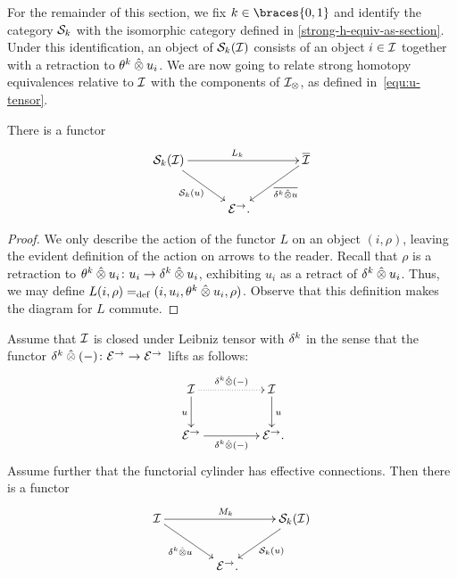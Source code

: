 \documentclass[reqno,10pt,a4paper,oneside,draft]{amsart}
\begin{document}
For the remainder of this section, we fix $k \in \braces{0, 1}$ and identify the category $\cal{S}_k$ with the isomorphic category defined in \cref{strong-h-equiv-as-section}.
Under this identification, an object of $\cal{S}_k(\cal{I})$ consists of an object $i \in \cal{I}$ together with a retraction to $\thetak \hatotimes u_i$.
We are now going to relate strong homotopy equivalences relative to $\cal{I}$ with the components of $\cal{I}_\otimes$,
as defined in~\eqref{equ:u-tensor}. 

\begin{lemma} \label{lem:from-strong-hequiv}
There is a functor
\[
\xymatrix@!C{
  \cal{S}_k(\cal{I})
  \ar[dr]_{\cal{S}_k(u)}
  \ar[rr]^{L_k}
&&
  \overline{\cal{I}}
  \ar[dl]^-{\overline{\kcyl \hatotimes u}}
\\&
  \catE^\to
\rlap{.}}
\]
\end{lemma}

\begin{proof}
We only describe the action of the functor $L$ on an object $(i, \rho)$, leaving the evident definition of the action on arrows to the reader.
Recall that $\rho$ is a retraction to $\thetak \hatotimes u_i \co u_i \to \kcyl \hatotimes u_i$, exhibiting $u_i$ as a retract of $\kcyl \hatotimes u_i$.
Thus, we may define $L(i, \rho) \defeq (i, u_i, \thetak \hatotimes u_i, \rho)$.
Observe that this definition makes the diagram for $L$ commute.
\end{proof}

\begin{lemma} \label{lem:to-strong-hequiv}
Assume that $\cal{I}$ is closed under Leibniz tensor with $\kcyl$ in the sense that the functor $\kcyl \hatotimes (-) \co \catE^\to \to \catE^\to$ lifts as follows:
\begin{equation}
\label{to-strong-hequiv:0}
\begin{gathered}
\xymatrix@C+2em{
  \cal{I}
  \ar[d]_u
  \ar@{.>}[r]^{\kcyl \hatotimes (-)}
&
  \cal{I}
  \ar[d]^{u}
\\
  \catE^\to
  \ar[r]_{\kcyl \hatotimes (-)}
&
  \catE^\to
\rlap{.}}
\end{gathered}
\end{equation}
Assume further that the functorial cylinder has effective connections.
Then there is a functor
\[
\xymatrix@!C{
  \cal{I}
  \ar[dr]_{\kcyl \hatotimes u} \ar[rr]^{M_k}
&&
  \cal{S}_k(\cal{I})
  \ar[dl]^{\cal{S}_k(u)}
\\&
   \catE^\to
\rlap{.}}
\]
\end{lemma}
\end{document}
